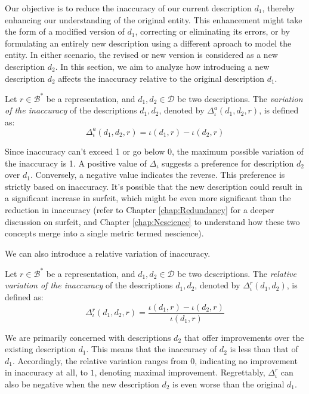 Our objective is to reduce the inaccuracy of our current description $d_1$, thereby enhancing our understanding of the original entity. This enhancement might take the form of a modified version of $d_1$, correcting or eliminating its errors, or by formulating an entirely new description using a different aproach to model the entity. In either scenario, the revised or new version is considered as a new description $d_2$. In this section, we aim to analyze how introducing a new description $d_2$ affects the inaccuracy relative to the original description $d_1$.

\begin{definition}
Let $r \in \mathcal{B}^\ast$ be a representation, and $d_1, d_2 \in \mathcal{D}$ be two descriptions. The \emph{variation of the inaccuracy} of the descriptions $d_1, d_2$, denoted by $\Delta^{a} _{\iota} ( d_1, d_2, r )$, is defined as:
\[
\Delta^{a}_{\iota} ( d_1, d_2, r ) = \iota(d_1, r) - \iota(d_2, r)
\] 
\end{definition}

Since inaccuracy can't exceed 1 or go below 0, the maximum possible variation of the inaccuracy is 1. A positive value of $\Delta_{\iota}$ suggests a preference for description $d_2$ over $d_1$. Conversely, a negative value indicates the reverse. This preference is strictly based on inaccuracy. It's possible that the new description could result in a significant increase in surfeit, which might be even more significant than the reduction in inaccuracy (refer to Chapter \ref{chap:Redundancy} for a deeper discussion on surfeit, and Chapter \ref{chap:Nescience} to understand how these two concepts merge into a single metric termed nescience).

We can also introduce a relative variation of inaccuracy.

\begin{definition}
Let $r \in \mathcal{B}^\ast$ be a representation, and $d_1, d_2 \in \mathcal{D}$ be two descriptions. The \emph{relative variation of the inaccuracy} of the descriptions $d_1, d_2$, denoted by $\Delta^{r}_{\iota} ( d_1, d_2 )$, is defined as:
\[
\Delta^{r}_{\iota} ( d_1, d_2, r ) = \frac{\iota(d_1, r) - \iota(d_2, r)}{\iota(d_1, r)}
\] 
\end{definition}

We are primarily concerned with descriptions $d_2$ that offer improvements over the existing description $d_1$. This means that the inaccuracy of $d_2$ is less than that of $d_1$. Accordingly, the relative variation ranges from $0$, indicating no improvement in inaccuracy at all, to $1$, denoting maximal improvement. Regrettably, $\Delta^{r}_{\iota}$ can also be negative when the new description $d_2$ is even worse than the original $d_1$.

